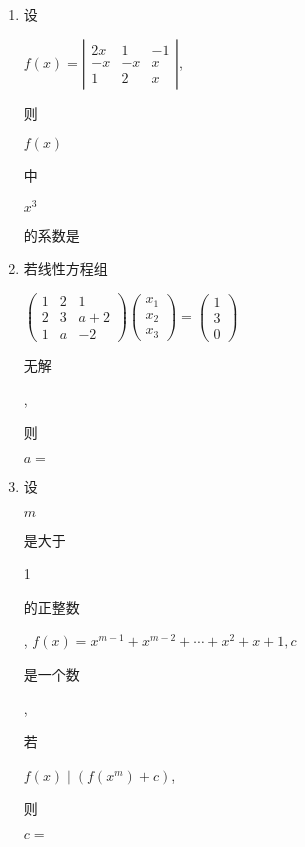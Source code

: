 \documentclass[10pt]{article}
\begin{document}
\begin{enumerate}
  \item \begin{CJK}{UTF8}{mj}设\end{CJK} $f(x)=\left|\begin{array}{ccc}2 x & 1 & -1 \\ -x & -x & x \\ 1 & 2 & x\end{array}\right|$, \begin{CJK}{UTF8}{mj}则\end{CJK} $f(x)$ \begin{CJK}{UTF8}{mj}中\end{CJK} $x^{3}$ \begin{CJK}{UTF8}{mj}的系数是\end{CJK}

  \item \begin{CJK}{UTF8}{mj}若线性方程组\end{CJK} $\left(\begin{array}{ccc}1 & 2 & 1 \\ 2 & 3 & a+2 \\ 1 & a & -2\end{array}\right)\left(\begin{array}{l}x_{1} \\ x_{2} \\ x_{3}\end{array}\right)=\left(\begin{array}{l}1 \\ 3 \\ 0\end{array}\right)$ \begin{CJK}{UTF8}{mj}无解\end{CJK}, \begin{CJK}{UTF8}{mj}则\end{CJK} $a=$

  \item \begin{CJK}{UTF8}{mj}设\end{CJK} $m$ \begin{CJK}{UTF8}{mj}是大于\end{CJK} 1 \begin{CJK}{UTF8}{mj}的正整数\end{CJK}, $f(x)=x^{m-1}+x^{m-2}+\cdots+x^{2}+x+1, c$ \begin{CJK}{UTF8}{mj}是一个数\end{CJK}, \begin{CJK}{UTF8}{mj}若\end{CJK} $f(x) \mid\left(f\left(x^{m}\right)+c\right)$, \begin{CJK}{UTF8}{mj}则\end{CJK} $c=$


\end{enumerate}
\end{document}
